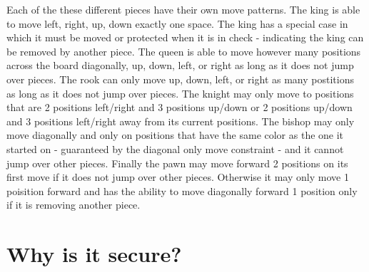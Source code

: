 \documentclass[12pt]{article}
\begin{document}
Each of the these different pieces have their own move patterns. The king is able to move left, right, up, down exactly one space. The king has a special case in which it must be moved or protected when it is in check - indicating the king can be removed by another piece. The queen is able to move however many positions across the board diagonally, up, down, left, or right as long as it does not jump over pieces. The rook can only move up, down, left, or right as many postitions as long as it does not jump over pieces. The knight may only move to positions that are 2 positions left/right and 3 positions up/down or 2 positions up/down and 3 positions left/right away from its current positions. The bishop may only move diagonally and only on positions that have the same color as the one it started on - guaranteed by the diagonal only move constraint - and it cannot jump over other pieces. Finally the pawn may move forward 2 positions on its first move if it does not jump over other pieces. Otherwise it may only move 1 poisition forward and has the ability to move diagonally forward 1 position only if it is removing another piece.


\section{Why is it secure?}
\end{document}
